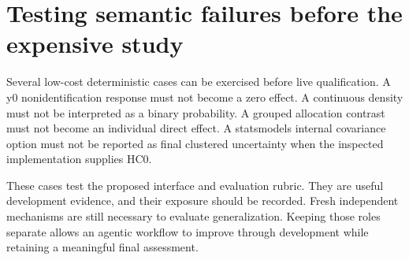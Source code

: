 \section{Testing semantic failures before the expensive study}

Several low-cost deterministic cases can be exercised before live qualification.
A y0 nonidentification response must not become a zero effect. A continuous
density must not be interpreted as a binary probability. A grouped allocation
contrast must not become an individual direct effect. A statsmodels internal
covariance option must not be reported as final clustered uncertainty when the
inspected implementation supplies HC0. \citep{v13_sw_y0,v13_sw_causalgps,v13_sw_inferference,v13_sw_statsmodels}

These cases test the proposed interface and evaluation rubric. They are useful
development evidence, and their exposure should be recorded. Fresh independent
mechanisms are still necessary to evaluate generalization. Keeping those roles
separate allows an agentic workflow to improve through development while
retaining a meaningful final assessment.

